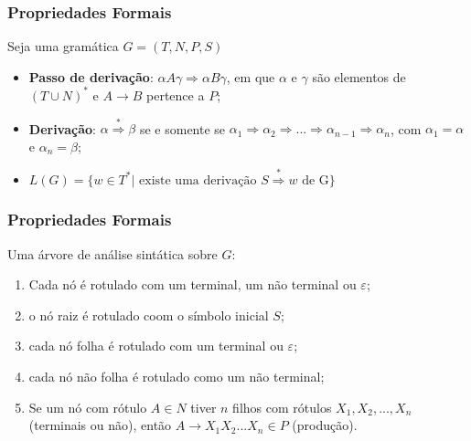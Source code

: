 \documentclass[table]{beamer}
\begin{document}
\begin{frame}
   \frametitle{Propriedades Formais}
   \begin{block}{Seja uma gramática $G=(T,N,P,S)$}
      \begin{itemize}
         \item \textbf{Passo de derivação}: $\alpha A \gamma \Rightarrow \alpha B \gamma$, em que $\alpha$ e $\gamma$ são elementos de $(T \cup N)^{*}$ e $A \to B$ pertence a $P$;
	 \item \textbf{Derivação}: $\alpha \overset{*}{\Rightarrow} \beta$ se e somente se $\alpha_{1} \Rightarrow \alpha_{2} \Rightarrow \text{...} \Rightarrow \alpha_{n-1} \Rightarrow \alpha_{n}$, com $\alpha_{1} = \alpha$ e $\alpha_{n} = \beta$;
	 \item $L(G)=\{ w \in T^{*} | \text{ existe uma derivação } S \overset{*}{\Rightarrow} w \text{ de G}  \}$
      \end{itemize}
   \end{block}
\end{frame}

\begin{frame}
   \frametitle{Propriedades Formais}
   \begin{block}{Uma árvore de análise sintática sobre $G$:}
      \begin{enumerate}
         \item Cada nó é rotulado com um terminal, um não terminal ou $\varepsilon$;
	 \item o nó raiz é rotulado coom o símbolo inicial $S$;
	 \item cada nó folha é rotulado com um terminal ou $\varepsilon$;
	 \item cada nó não folha é rotulado como um não terminal;
	 \item Se um nó com rótulo $A \in N$ tiver $n$ filhos com rótulos $X_{1}, X_{2}, ... , X_{n}$ (terminais ou não), então $A \to X_{1} X_{2} ... X_{n} \in P$ (produção).
      \end{enumerate}
   \end{block}
\end{frame}
\end{document}
